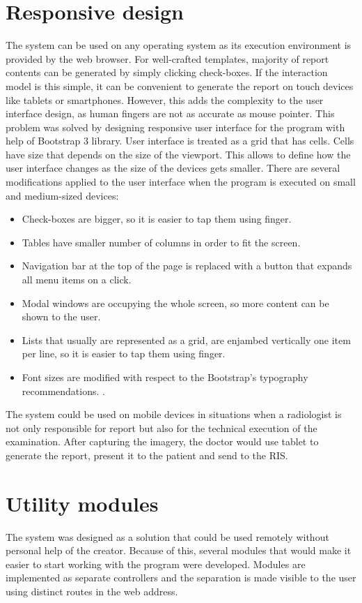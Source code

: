 \documentclass[12pt, twoside, openany]{report}
\theoremstyle{definition}
\begin{document}
\section{Responsive design}
The system can be used on any operating system as its execution environment is provided by the web browser. For well-crafted templates, majority of report contents can be generated by simply clicking check-boxes. If the interaction model is this simple, it can be convenient to generate the report on touch devices like tablets or smartphones. However, this adds the complexity to the user interface design, as human fingers are not as accurate as mouse pointer. This problem was solved by designing responsive user interface for the program with help of Bootstrap 3 library. User interface is treated as a grid that has cells. Cells have size that depends on the size of the viewport. This allows to define how the user interface changes as the size of the devices gets smaller. There are several modifications applied to the user interface when the program is executed on small and medium-sized devices:
\begin{itemize}
\item Check-boxes are bigger, so it is easier to tap them using finger.
\item Tables have smaller number of columns in order to fit the screen. 
\item Navigation bar at the top of the page is replaced with a button that expands all menu items on a click. 
\item Modal windows are occupying the whole screen, so more content can be shown to the user.
\item Lists that usually are represented as a grid, are enjambed vertically one item per line, so it is easier to tap them using finger.
\item Font sizes are modified with respect to the Bootstrap's typography recommendations. \cite{bootstrap-typography}.
\end{itemize} 
The system could be used on mobile devices in situations when a radiologist is not only responsible for report but also for the technical execution of the examination. After capturing the imagery, the doctor would use tablet to generate the report, present it to the patient and send to the RIS.
\section{Utility modules}
The system was designed as a solution that could be used remotely without personal help of the creator. Because of this, several modules that would make it easier to start working with the program were developed. Modules are implemented as separate controllers and the separation is made visible to the user using distinct routes in the web address.
\end{document}

